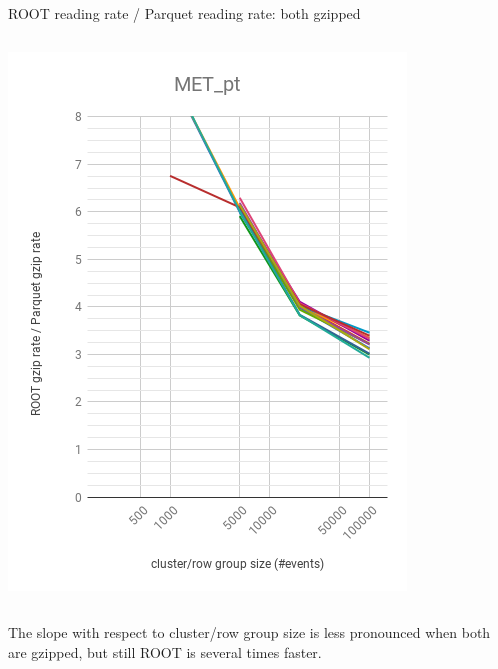 \documentclass[aspectratio=169]{beamer}
\begin{document}
\begin{frame}{ROOT reading rate / Parquet reading rate: both gzipped}
\begin{columns}
\begin{center}
\includegraphics[width=\linewidth]{root-gzip-parquet-gzip-MET_pt.png}
\end{center}
\end{columns}

\vspace{0.25 cm}
The slope with respect to cluster/row group size is less pronounced when both are gzipped, but still ROOT is several times faster.
\end{frame}
\end{document}
